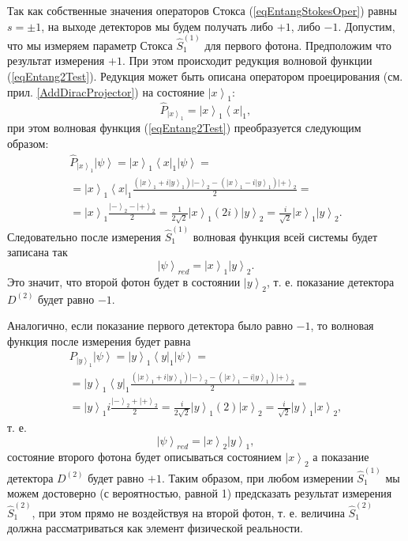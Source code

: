 Так как собственные значения операторов Стокса
(\ref{eqEntangStokesOper}) равны $s = \pm 1$, на выходе детекторов мы
будем получать либо $+1$, либо $-1$. Допустим, что мы измеряем параметр
Стокса $\hat{S}_1^{(1)}$ для первого фотона. Предположим что
результат измерения $+1$. При этом происходит редукция волновой функции
(\ref{eqEntang2Test}). Редукция может быть описана оператором
проецирования (см. прил. \ref{AddDiracProjector}) на состояние
$\left|x\right>_1$:
\[
\hat{P}_{\left|x\right>_1} = \left|x\right>_1\left<x\right|_1,
\]
при этом волновая функция
(\ref{eqEntang2Test}) преобразуется следующим образом:
\begin{eqnarray}
  \hat{P}_{\left|x\right>_1}\left|\psi\right> =
  \left|x\right>_1\left<x\right|_1 \left|\psi\right> =
  \nonumber \\
    =
  \left|x\right>_1\left<x\right|_1
  \frac{
    \left( \left|x\right>_1 + i \left|y\right>_1 \right)\left| - \right>_2 -
    \left( \left|x\right>_1 - i \left|y\right>_1 \right)\left| + \right>_2
  }{2} =
  \nonumber \\
  =
  \left|x\right>_1
  \frac{\left| - \right>_2 - \left| + \right>_2}{2} =
  \frac{1}{2\sqrt{2}}\left|x\right>_1 \left(2 i\right)
  \left|y\right>_2 =
  \frac{i}{\sqrt{2}}\left|x\right>_1\left|y\right>_2.
\nonumber
\end{eqnarray}
Следовательно после измерения $\hat{S}_1^{(1)}$ волновая функция всей
системы будет записана так
\[
\left|\psi\right>_{red} = \left|x\right>_1\left|y\right>_2.
\]
Это значит, что второй фотон будет в состоянии $\left|y\right>_2$,
т. е.  показание детектора $D^{(2)}$ будет равно $-1$.

Аналогично, если показание первого детектора было равно $-1$, то
волновая функция после измерения будет равна
\begin{eqnarray}
  P_{\left|y\right>_1}\left|\psi\right> =
  \left|y\right>_1\left<y\right|_1 \left|\psi\right> =
  \nonumber \\
  =
  \left|y\right>_1\left<y\right|_1
  \frac{
    \left( \left|x\right>_1 + i \left|y\right>_1 \right)\left| - \right>_2 -
    \left( \left|x\right>_1 - i \left|y\right>_1 \right)\left| + \right>_2
  }{2} =
  \nonumber \\
  =
  \left|y\right>_1 i 
  \frac{\left| - \right>_2 + \left| + \right>_2}{2} =
  \frac{i}{2\sqrt{2}}\left|y\right>_1 \left(2\right)
  \left|x\right>_2 =
  \frac{i}{\sqrt{2}}\left|y\right>_1\left|x\right>_2,
  \nonumber
\end{eqnarray}
т. е.
\[
\left|\psi\right>_{red} = \left|x\right>_2\left|y\right>_1,
\]
состояние второго фотона будет описываться состоянием
$\left|x\right>_2$ а показание детектора $D^{(2)}$ будет равно $+1$.
Таким образом, при любом измерении $\hat{S}_1^{(1)}$ мы можем
достоверно (с вероятностью, равной 1) предсказать результат измерения
$\hat{S}_1^{(2)}$, при этом прямо не воздействуя на второй фотон, т. е.
величина $\hat{S}_1^{(2)}$ должна рассматриваться как элемент
физической реальности.


